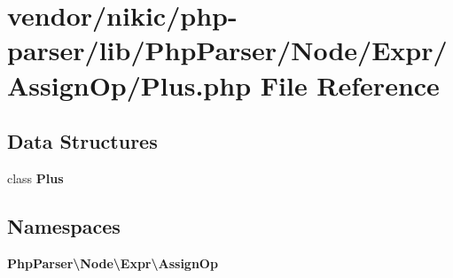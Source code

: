 \section{vendor/nikic/php-\/parser/lib/\+Php\+Parser/\+Node/\+Expr/\+Assign\+Op/\+Plus.php File Reference}
\label{_assign_op_2_plus_8php}
\subsection*{Data Structures}
\begin{DoxyCompactItemize}
\item 
class {\bf Plus}
\end{DoxyCompactItemize}
\subsection*{Namespaces}
\begin{DoxyCompactItemize}
\item 
 {\bf Php\+Parser\textbackslash{}\+Node\textbackslash{}\+Expr\textbackslash{}\+Assign\+Op}
\end{DoxyCompactItemize}
